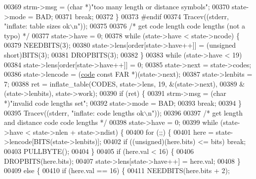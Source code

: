 \begin{DoxyCode}
{{{{00369                 strm->msg = (\textcolor{keywordtype}{char} *)\textcolor{stringliteral}{"too many length or distance symbols"};
00370                 state->mode = BAD;
00371                 \textcolor{keywordflow}{break};
00372             \}
00373 \textcolor{preprocessor}{#endif}
00374             Tracev((stderr, \textcolor{stringliteral}{"inflate:       table sizes ok\(\backslash\)n"}));
00375 
00376             \textcolor{comment}{/* get code length code lengths (not a typo) */}
00377             state->have = 0;
00378             \textcolor{keywordflow}{while} (state->have < state->ncode) \{
00379                 NEEDBITS(3);
00380                 state->lens[order[state->have++]] = (\textcolor{keywordtype}{unsigned} short)BITS(3);
00381                 DROPBITS(3);
00382             \}
00383             \textcolor{keywordflow}{while} (state->have < 19)
00384                 state->lens[order[state->have++]] = 0;
00385             state->next = state->codes;
00386             state->lencode = (\hyperlink{structcode}{code} \textcolor{keyword}{const} FAR *)(state->next);
00387             state->lenbits = 7;
00388             ret = inflate\_table(CODES, state->lens, 19, &(state->next),
00389                                 &(state->lenbits), state->work);
00390             \textcolor{keywordflow}{if} (ret) \{
00391                 strm->msg = (\textcolor{keywordtype}{char} *)\textcolor{stringliteral}{"invalid code lengths set"};
00392                 state->mode = BAD;
00393                 \textcolor{keywordflow}{break};
00394             \}
00395             Tracev((stderr, \textcolor{stringliteral}{"inflate:       code lengths ok\(\backslash\)n"}));
00396 
00397             \textcolor{comment}{/* get length and distance code code lengths */}
00398             state->have = 0;
00399             \textcolor{keywordflow}{while} (state->have < state->nlen + state->ndist) \{
00400                 \textcolor{keywordflow}{for} (;;) \{
00401                     here = state->lencode[BITS(state->lenbits)];
00402                     \textcolor{keywordflow}{if} ((\textcolor{keywordtype}{unsigned})(here.bits) <= bits) \textcolor{keywordflow}{break};
00403                     PULLBYTE();
00404                 \}
00405                 \textcolor{keywordflow}{if} (here.val < 16) \{
00406                     DROPBITS(here.bits);
00407                     state->lens[state->have++] = here.val;
00408                 \}
00409                 \textcolor{keywordflow}{else} \{
00410                     \textcolor{keywordflow}{if} (here.val == 16) \{
00411                         NEEDBITS(here.bits + 2);
}}}}
\end{DoxyCode}
